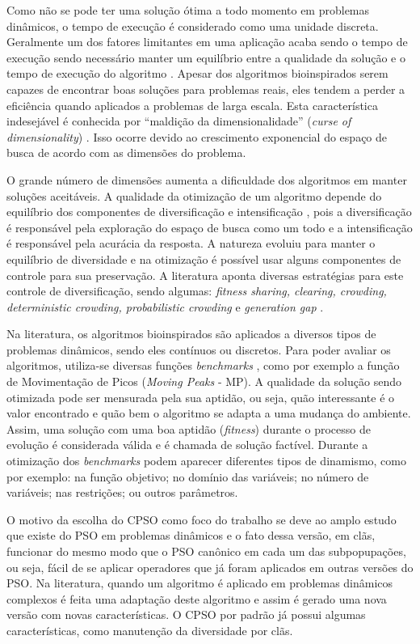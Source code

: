 Como não se pode ter uma solução ótima a todo momento em problemas dinâmicos, o tempo de execução é considerado como uma unidade discreta. Geralmente um dos fatores limitantes em uma aplicação acaba sendo o tempo de execução sendo necessário manter um equilíbrio entre a qualidade da solução e o tempo de execução do algoritmo \cite{li2006new}. Apesar dos algoritmos bioinspirados serem capazes de encontrar boas soluções para problemas reais, eles tendem a perder a eficiência quando aplicados a problemas de larga escala. Esta característica indesejável é conhecida por “maldição da dimensionalidade” (\textit{curse of dimensionality}) \cite{bellman2015applied}. Isso ocorre devido ao crescimento exponencial do espaço de busca de acordo com as dimensões do problema.

O grande número de dimensões aumenta a dificuldade dos algoritmos em manter soluções aceitáveis. A qualidade da otimização de um algoritmo depende do equilíbrio dos componentes de diversificação e intensificação \cite{boussaid2013survey}, pois a diversificação é responsável pela exploração do espaço de busca como um todo e a intensificação é responsável pela acurácia da resposta. A natureza evoluiu para manter o equilíbrio de diversidade e na otimização é possível usar alguns componentes de controle para sua preservação. A literatura aponta diversas estratégias para este controle de diversificação, sendo algumas: \textit{fitness sharing, clearing, crowding, deterministic crowding, probabilistic crowding} e \textit{generation gap} \cite{andre2015multiple}.

Na literatura, os algoritmos bioinspirados são aplicados a diversos tipos de problemas dinâmicos, sendo eles contínuos ou discretos. Para poder avaliar os algoritmos, utiliza-se diversas funções \textit{benchmarks} \cite{moser2007review}, como por exemplo a função de Movimentação de Picos (\textit{Moving Peaks} - MP). A qualidade da solução sendo otimizada pode ser mensurada pela sua aptidão, ou seja, quão interessante é o valor encontrado e quão bem o algoritmo se adapta a uma mudança do ambiente. Assim, uma solução com uma boa aptidão (\textit{fitness}) durante o processo de evolução é considerada válida e é chamada de solução factível. Durante a otimização dos \textit{benchmarks} podem aparecer diferentes tipos de dinamismo, como por exemplo: na função objetivo; no domínio das variáveis; no número de variáveis; nas restrições; ou outros parâmetros.

O motivo da escolha do CPSO como foco do trabalho se deve ao amplo estudo que existe do PSO em problemas dinâmicos e o fato dessa versão, em clãs, funcionar do mesmo modo que o PSO canônico em cada um das subpopupações, ou seja, fácil de se aplicar operadores que já foram aplicados em outras versões do PSO. Na literatura, quando um algoritmo é aplicado em problemas dinâmicos complexos é feita uma adaptação deste algoritmo e assim é gerado uma nova versão com novas características. O CPSO por padrão já possui algumas características, como manutenção da diversidade por clãs.

